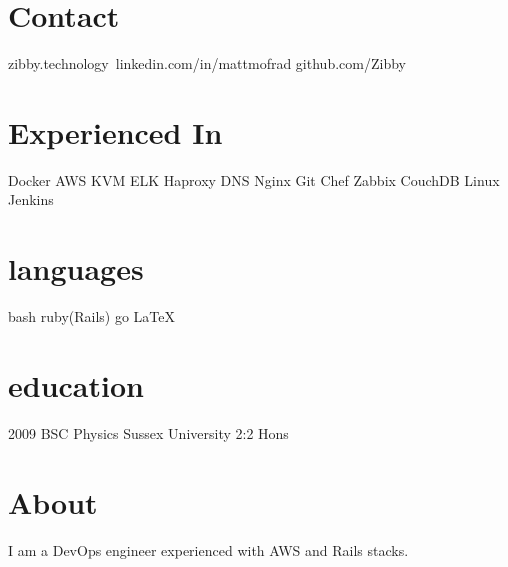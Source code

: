 \documentclass[]{friggeri-cv-a4}
\begin{document}

\begin{aside}
  \section{Contact}
    zibby.technology\faCloud\
    linkedin.com/in/mattmofrad\faLinkedinSquare
    github.com/Zibby\faGithub
	\section{Experienced In}
    Docker
    AWS
    KVM
    ELK
    Haproxy
    DNS
    Nginx
    Git
    Chef
    Zabbix
    CouchDB
		Linux
		Jenkins
  \section{languages}
    bash
		ruby(Rails)
    go
    \LaTeX
  \section{education}
    2009 BSC Physics Sussex University 2:2 Hons
\end{aside}

\section{About}
I am a DevOps engineer experienced with AWS and Rails stacks.  
\end{document}
